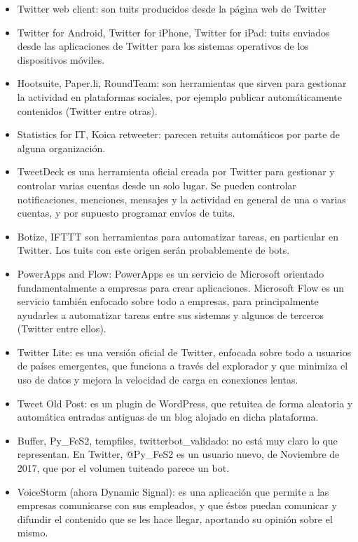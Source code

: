 \begin{itemize}
\item Twitter web client: son tuits producidos desde la página web de Twitter
\item Twitter for Android, Twitter for iPhone, Twitter for iPad: tuits enviados desde las aplicaciones
de Twitter para los sistemas operativos de los dispositivos móviles.
\item Hootsuite, Paper.li, RoundTeam: son herramientas que sirven para gestionar 
la actividad en plataformas
sociales, por ejemplo publicar automáticamente contenidos (Twitter entre otras).
\item Statistics for IT, Koica retweeter: parecen retuits automáticos por parte
de alguna organización.
\item TweetDeck es una herramienta oficial creada por Twitter para gestionar y controlar 
varias cuentas desde un solo lugar. Se pueden controlar notificaciones, menciones, 
mensajes y la actividad en general de una o varias cuentas, y por supuesto programar envíos
de tuits.
\item Botize, IFTTT son herramientas para automatizar tareas, en particular en Twitter. 
Los tuits con este origen serán probablemente de bots.
\item PowerApps and Flow: PowerApps es un servicio de Microsoft 
orientado fundamentalmente a empresas para crear aplicaciones. Microsoft Flow 
es un servicio también enfocado sobre todo a empresas, para principalmente ayudarles a 
automatizar tareas entre sus sistemas y algunos de terceros (Twitter entre ellos).
\item Twitter Lite: es una versión oficial de Twitter, enfocada sobre todo a usuarios 
de países emergentes, que funciona a través del explorador y que minimiza el uso de datos 
y mejora la velocidad de carga en conexiones lentas.
\item Tweet Old Post: es un plugin de WordPress, que retuitea de forma aleatoria y 
automática entradas antiguas de un blog alojado en dicha plataforma.
\item Buffer, Py\_FeS2, tempfiles, twitterbot\_validado: no está muy claro lo que representan. 
En Twitter, @Py\_FeS2 es un usuario nuevo, de Noviembre de 2017, que por el volumen 
tuiteado parece un bot.
\item VoiceStorm (ahora Dynamic Signal): es una aplicación que permite a las
empresas comunicarse con sus empleados, y que éstos puedan comunicar y difundir el contenido
que se les hace llegar, aportando su opinión sobre el mismo.
\end{itemize}

